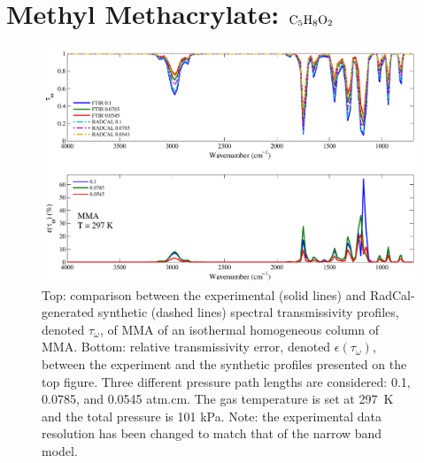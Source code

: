 \clearpage

\section{Methyl Methacrylate: $\rm C_5H_8O_2$}

\begin{figure}[h]
\includegraphics[width=\textwidth]{../Verification/Results_Test2/MMA_297.pdf}
\caption{Top: comparison between the experimental (solid lines) and RadCal-generated synthetic (dashed lines) spectral transmissivity profiles, denoted $\tau_{\omega}$, of MMA of an isothermal homogeneous column of MMA. Bottom: relative transmissivity error, denoted $\epsilon{(\tau_{\omega})}$, between the experiment and the synthetic profiles presented on the top figure. Three different pressure path lengths are considered: 0.1, 0.0785, and 0.0545 atm.cm. The gas temperature is set at 297~K and the total pressure is 101 kPa. Note: the experimental data resolution has been changed to match that of the narrow band model. \label{fig:MMA_Verify_297K}}
\end{figure}

\newpage

